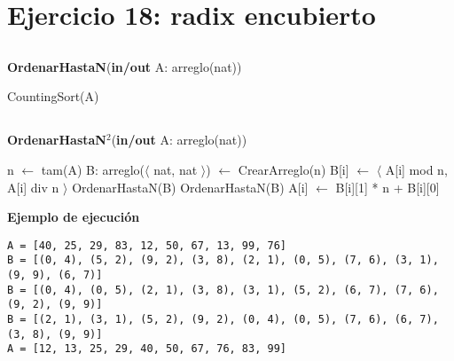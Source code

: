 \section{Ejercicio 18: radix encubierto}

\subsection{}

\begin{algorithm}[H]
\caption{
    \textbf{OrdenarHastaN}(\textbf{in/out} A: arreglo(nat))
}
\begin{algorithmic}[1]
    \State CountingSort(A) 
\end{algorithmic}
\end{algorithm}

\subsection{}

\begin{algorithm}[H]
\caption{
    \textbf{OrdenarHastaN$^2$}(\textbf{in/out} A: arreglo(nat))
}
\begin{algorithmic}[1]
    \State n $\gets$ tam(A)
    \State B: arreglo($\langle$ nat, nat $\rangle$) $\gets$ CrearArreglo(n) 
     
        \State B[i] $\gets$ $\langle$ A[i] mod n, A[i] div n $\rangle$
    \EndFor
    \State OrdenarHastaN(B) 
    \State OrdenarHastaN(B) 
     
        \State A[i] $\gets$ B[i][1] * n + B[i][0]
    \EndFor
\end{algorithmic}
\end{algorithm}

\textbf{Ejemplo de ejecución}

\begin{lstlisting}
A = [40, 25, 29, 83, 12, 50, 67, 13, 99, 76]
B = [(0, 4), (5, 2), (9, 2), (3, 8), (2, 1), (0, 5), (7, 6), (3, 1), (9, 9), (6, 7)]
B = [(0, 4), (0, 5), (2, 1), (3, 8), (3, 1), (5, 2), (6, 7), (7, 6), (9, 2), (9, 9)]
B = [(2, 1), (3, 1), (5, 2), (9, 2), (0, 4), (0, 5), (7, 6), (6, 7), (3, 8), (9, 9)]
A = [12, 13, 25, 29, 40, 50, 67, 76, 83, 99]
\end{lstlisting}

